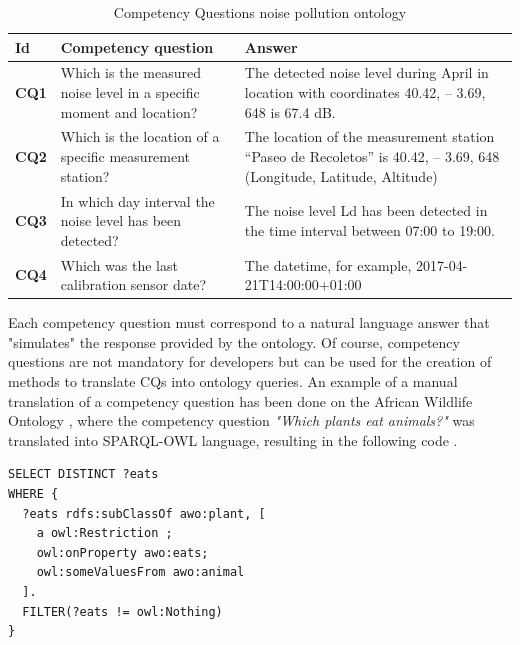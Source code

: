 \begin{table}[H]
    \centering
    \begin{tabular}{|>{\raggedright\arraybackslash}p{1cm}|>{\raggedright\arraybackslash}p{6cm}|>{\raggedright\arraybackslash}p{6cm}|}
        \hline
        \textbf{Id} & \textbf{Competency question} & \textbf{Answer} \\ \hline
        \textbf{CQ1} & Which is the measured noise level in a specific moment and location? & The detected noise level during April in location with coordinates 40.42, – 3.69, 648 is 67.4 dB. \\ \hline
        \textbf{CQ2} & Which is the location of a specific measurement station? & The location of the measurement station “Paseo de Recoletos” is 40.42, – 3.69, 648 (Longitude, Latitude, Altitude) \\ \hline
        \textbf{CQ3} & In which day interval the noise level has been detected? & The noise level Ld has been detected in the time interval between 07:00 to 19:00. \\ \hline
        \textbf{CQ4} & Which was the last calibration sensor date? & The datetime, for example, 2017-04-21T14:00:00+01:00 \\ \hline
    \end{tabular}
    \caption{Competency Questions noise pollution ontology}
\end{table}

Each competency question must correspond to a natural language answer that "simulates" the response provided by the ontology. Of course, competency questions are not mandatory for developers but can be used for the creation of methods to translate CQs into ontology queries. An example of a manual translation of a competency question has been done on the African Wildlife Ontology \cite{keet2020african}, where the competency question \textit{"Which plants eat animals?"} was translated into SPARQL-OWL language, resulting in the following code \cite{wisniewski2019analysis}.

\begin{verbatim}
SELECT DISTINCT ?eats
WHERE {
  ?eats rdfs:subClassOf awo:plant, [
    a owl:Restriction ;
    owl:onProperty awo:eats;
    owl:someValuesFrom awo:animal
  ].
  FILTER(?eats != owl:Nothing)
}
\end{verbatim}

